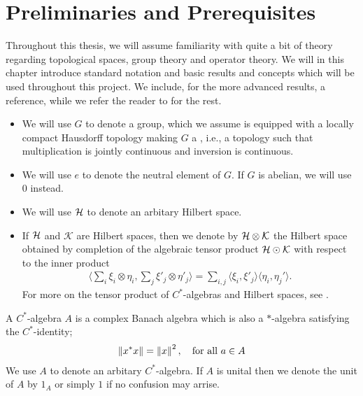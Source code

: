\chapter{Preliminaries and Prerequisites}
Throughout this thesis, we will assume familiarity with quite a bit of theory regarding topological spaces, group theory and operator theory. We will in this chapter introduce standard notation and basic results and concepts which will be used throughout this project. We include, for the more advanced results, a reference, while we refer the reader to \cite{brown2008c,zhu,folland2013real,blackadar} for the rest.
\begin{itemize}
	\item We will use $G$ to denote a group, which we assume is equipped with a locally compact Hausdorff topology making $G$ a , i.e., a topology such that multiplication is jointly continuous and inversion is continuous.
	\item We will use $e$ to denote the neutral element of $G$. If $G$ is abelian, we will use $0$ instead.
	\item We will use $\mathcal{H}$ to denote an arbitary Hilbert space.
	\item If $\mathcal{H}$ and $\mathcal{K}$ are Hilbert spaces, then we denote by $\mathcal{H} \otimes \mathcal{K}$ the Hilbert space obtained by completion of the algebraic tensor product $\mathcal{H} \odot \mathcal{K}$ with respect to the inner product
		\begin{align*}
			\langle \sum_{i}\xi_i \otimes \eta_i, \sum_j \xi'_j \otimes \eta'_j\rangle = \sum_{i,j} \langle \xi_i, \xi'_j\rangle \langle \eta_i, \eta_j'\rangle. 
		\end{align*}
		For more on the tensor product of $C^*$-algebras and Hilbert spaces, see \cite[chapter 3.1-3.3]{brown2008c}.
\end{itemize}
A $C^*$-algebra $A$ is a complex Banach algebra which is also a $*$-algebra satisfying the $C^*$-identity; 
\begin{align*}
\left\lVert x^*x \right\rVert = \left\lVert x\right\rVert^2, \quad \text{for all } a \in A
\end{align*}
We use $A$ to denote an arbitary $C^*$-algebra. If $A$ is unital then we denote the unit of $A$ by $1_{A}$ or simply $1$ if no confusion may arrise. 
